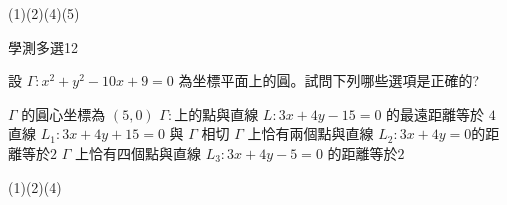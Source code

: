 \begin{QUESTIONS}
\begin{QUESTION}
        \begin{QANS}
            (1)(2)(4)(5)
        \end{QANS}
        \begin{QSOLLIST}
        \end{QSOLLIST}
        \begin{QEMPTYSPACE}
        \end{QEMPTYSPACE}
    \end{QUESTION}
    \begin{QUESTION}
        \begin{ExamInfo}{97}{學測}{多選}{12}
        \end{ExamInfo}
        \begin{ExamAnsRateInfo}{34}{62}{29}{11}
        \end{ExamAnsRateInfo}
        \begin{QBODY}
            設 $\Gamma : x^2 + y^2 - 10x + 9 = 0$ 為坐標平面上的圓。試問下列哪些選項是正確的? 
			\begin{QOPS} 
				\QOP $\Gamma$ 的圓心坐標為 $(5,0)$ 
				\QOP $\Gamma:$上的點與直線 $L: 3x+4y-15=0$ 的最遠距離等於 $4 $
				\QOP 直線 $L_1 :3x+4y+15=0$ 與 $\Gamma$ 相切    
                \QOP $\Gamma$ 上恰有兩個點與直線 $L_2 :3x+4y=0 $的距離等於$2$ 
				\QOP $\Gamma$ 上恰有四個點與直線 $L_3 :3x+4y - 5=0$ 的距離等於$2$
			\end{QOPS}
        \end{QBODY}
        \begin{QFROMS}
        \end{QFROMS}
        \begin{QTAGS}\end{QTAGS}
        \begin{QANS}
            (1)(2)(4)
        \end{QANS}
        \begin{QSOLLIST}
        \end{QSOLLIST}
        \begin{QEMPTYSPACE}
        \end{QEMPTYSPACE}
    \end{QUESTION}
\end{QUESTIONS}
